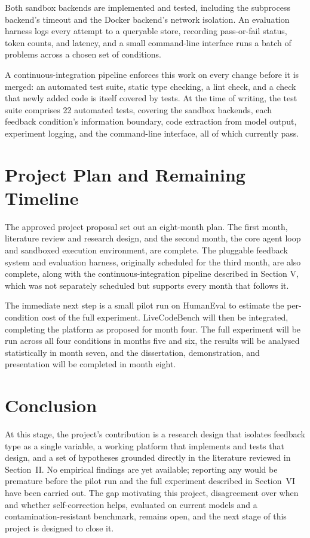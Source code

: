\documentclass[conference]{IEEEtran}
\begin{document}
Both sandbox backends are implemented and tested, including the subprocess backend's timeout and the Docker backend's network isolation. An evaluation harness logs every attempt to a queryable store, recording pass-or-fail status, token counts, and latency, and a small command-line interface runs a batch of problems across a chosen set of conditions.

A continuous-integration pipeline enforces this work on every change before it is merged: an automated test suite, static type checking, a lint check, and a check that newly added code is itself covered by tests. At the time of writing, the test suite comprises 22 automated tests, covering the sandbox backends, each feedback condition's information boundary, code extraction from model output, experiment logging, and the command-line interface, all of which currently pass.

\section{Project Plan and Remaining Timeline}

The approved project proposal set out an eight-month plan. The first month, literature review and research design, and the second month, the core agent loop and sandboxed execution environment, are complete. The pluggable feedback system and evaluation harness, originally scheduled for the third month, are also complete, along with the continuous-integration pipeline described in Section V, which was not separately scheduled but supports every month that follows it.

The immediate next step is a small pilot run on HumanEval to estimate the per-condition cost of the full experiment. LiveCodeBench will then be integrated, completing the platform as proposed for month four. The full experiment will be run across all four conditions in months five and six, the results will be analysed statistically in month seven, and the dissertation, demonstration, and presentation will be completed in month eight.

\section{Conclusion}

At this stage, the project's contribution is a research design that isolates feedback type as a single variable, a working platform that implements and tests that design, and a set of hypotheses grounded directly in the literature reviewed in Section~II. No empirical findings are yet available; reporting any would be premature before the pilot run and the full experiment described in Section~VI have been carried out. The gap motivating this project, disagreement over when and whether self-correction helps, evaluated on current models and a contamination-resistant benchmark, remains open, and the next stage of this project is designed to close it.



\end{document}
